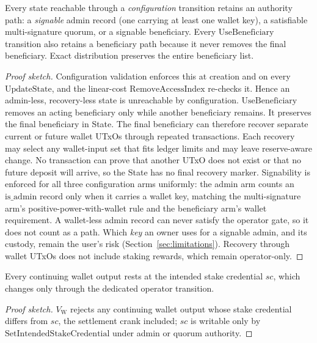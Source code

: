 \documentclass[11pt,DIV=11,parskip=half-]{scrartcl}
\begin{document}
\begin{theorem}
Every state reachable through a \emph{configuration} transition retains an authority path: a \emph{signable} admin record (one carrying at least one wallet key), a satisfiable multi-signature quorum, or a signable beneficiary. Every $\mathrm{UseBeneficiary}$ transition also retains a beneficiary path because it never removes the final beneficiary. Exact distribution preserves the entire beneficiary list.
\end{theorem}
\begin{proof}[Proof sketch]
Configuration validation enforces this at creation and on every $\mathrm{UpdateState}$, and the linear-cost $\mathrm{RemoveAccessIndex}$ re-checks it. Hence an admin-less, recovery-less state is unreachable by configuration. $\mathrm{UseBeneficiary}$ removes an acting beneficiary only while another beneficiary remains. It preserves the final beneficiary in State. The final beneficiary can therefore recover separate current or future wallet UTxOs through repeated transactions. Each recovery may select any wallet-input set that fits ledger limits and may leave reserve-aware change. No transaction can prove that another UTxO does not exist or that no future deposit will arrive, so the State has no final recovery marker. Signability is enforced for all three configuration arms uniformly: the admin arm counts an $\mathrm{is\_admin}$ record only when it carries a wallet key, matching the multi-signature arm's positive-power-with-wallet rule and the beneficiary arm's wallet requirement. A wallet-less admin record can never satisfy the operator gate, so it does not count as a path. Which \emph{key} an owner uses for a signable admin, and its custody, remain the user's risk (Section~\ref{sec:limitations}). Recovery through wallet UTxOs does not include staking rewards, which remain operator-only.
\end{proof}

\begin{theorem}
Every continuing wallet output rests at the intended stake credential $\mathit{sc}$, which changes only through the dedicated operator transition.
\end{theorem}
\begin{proof}[Proof sketch]
$V_{\mathrm{W}}$ rejects any continuing wallet output whose stake credential differs from $\mathit{sc}$, the settlement crank included; $\mathit{sc}$ is writable only by $\mathrm{SetIntendedStakeCredential}$ under admin or quorum authority.
\end{proof}
\end{document}
